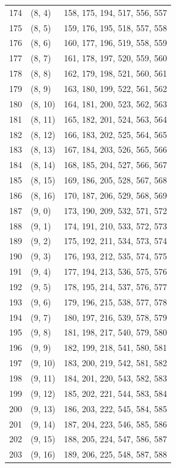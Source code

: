 \documentclass{article}
\begin{document}
\begin{longtable}{lll}
  174 & (8, 4) & 158, 175, 194, 517, 556, 557 \\
  175 & (8, 5) & 159, 176, 195, 518, 557, 558 \\
  176 & (8, 6) & 160, 177, 196, 519, 558, 559 \\
  177 & (8, 7) & 161, 178, 197, 520, 559, 560 \\
  178 & (8, 8) & 162, 179, 198, 521, 560, 561 \\
  179 & (8, 9) & 163, 180, 199, 522, 561, 562 \\
  180 & (8, 10) & 164, 181, 200, 523, 562, 563 \\
  181 & (8, 11) & 165, 182, 201, 524, 563, 564 \\
  182 & (8, 12) & 166, 183, 202, 525, 564, 565 \\
  183 & (8, 13) & 167, 184, 203, 526, 565, 566 \\
  184 & (8, 14) & 168, 185, 204, 527, 566, 567 \\
  185 & (8, 15) & 169, 186, 205, 528, 567, 568 \\
  186 & (8, 16) & 170, 187, 206, 529, 568, 569 \\
  187 & (9, 0) & 173, 190, 209, 532, 571, 572 \\
  188 & (9, 1) & 174, 191, 210, 533, 572, 573 \\
  189 & (9, 2) & 175, 192, 211, 534, 573, 574 \\
  190 & (9, 3) & 176, 193, 212, 535, 574, 575 \\
  191 & (9, 4) & 177, 194, 213, 536, 575, 576 \\
  192 & (9, 5) & 178, 195, 214, 537, 576, 577 \\
  193 & (9, 6) & 179, 196, 215, 538, 577, 578 \\
  194 & (9, 7) & 180, 197, 216, 539, 578, 579 \\
  195 & (9, 8) & 181, 198, 217, 540, 579, 580 \\
  196 & (9, 9) & 182, 199, 218, 541, 580, 581 \\
  197 & (9, 10) & 183, 200, 219, 542, 581, 582 \\
  198 & (9, 11) & 184, 201, 220, 543, 582, 583 \\
  199 & (9, 12) & 185, 202, 221, 544, 583, 584 \\
  200 & (9, 13) & 186, 203, 222, 545, 584, 585 \\
  201 & (9, 14) & 187, 204, 223, 546, 585, 586 \\
  202 & (9, 15) & 188, 205, 224, 547, 586, 587 \\
  203 & (9, 16) & 189, 206, 225, 548, 587, 588 \\

\end{longtable}
\end{document}
